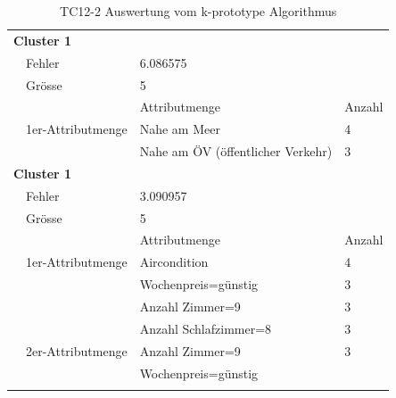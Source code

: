 \begin{longtable}{ | l | l | l | l |}
	\multicolumn{4}{|l|}{\textbf{Cluster 1}} \\ \cline{2-4}
	& Fehler & \multicolumn{2}{|l|}{6.086575} \\ \cline{2-4}  
	& Grösse & \multicolumn{2}{|l|}{5} \\ \cline{2-4} 
	&& Attributmenge & Anzahl \\ \cline{2-4} 
	
	& 1er-Attributmenge & \tabitem Nahe am Meer & 4 \\ \cline{2-4}
	& & \tabitem Nahe am ÖV (öffentlicher Verkehr) & 3 \\ \hline
		
	\multicolumn{4}{|l|}{\textbf{Cluster 1}} \\ \cline{2-4} 
	& Fehler & \multicolumn{2}{|l|}{3.090957} \\ \cline{2-4} 
	& Grösse & \multicolumn{2}{|l|}{5} \\ \cline{2-4} 
	&& Attributmenge & Anzahl \\ \cline{2-4} 
	
	& 1er-Attributmenge & \tabitem Aircondition & 4 \\ \cline{3-4} 
	& & \tabitem Wochenpreis=günstig & 3 \\ \cline{3-4} 
	& & \tabitem Anzahl Zimmer=9 & 3 \\ \cline{3-4} 
	& & \tabitem Anzahl Schlafzimmer=8 & 3 \\ \cline{2-4} 
	
	& 2er-Attributmenge & \tabitem Anzahl Zimmer=9 & 3 \\
	& & \tabitem Wochenpreis=günstig & \\ \hline
		
	\caption{TC12-2 Auswertung vom k-prototype Algorithmus}
	\centering
	\label{fig:testingfazit:testing:testcases:12:2}
\end{longtable}
